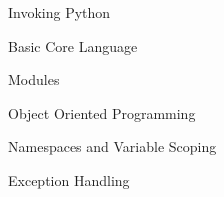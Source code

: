 \documentclass[mathserif,20pt,xcolor=table,compress,aspectratio=169]{beamer}
\begin{document}
\begin{frame}{Invoking Python}

\end{frame}





\begin{frame}[plain]
\sectionpage
\end{frame}


\begin{frame}{Basic Core Language}


\end{frame}


\begin{frame}{Modules}
\end{frame}


\begin{frame}{Object Oriented Programming}
\end{frame}


\begin{frame}{Namespaces and Variable Scoping}
\end{frame}


\begin{frame}{Exception Handling}
\end{frame}
\end{document}
